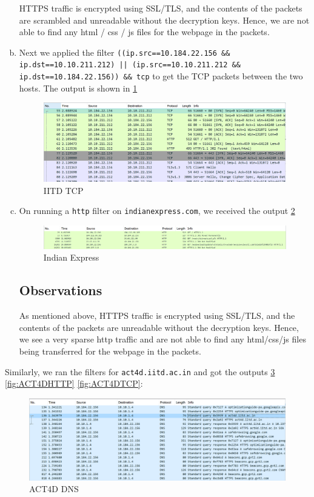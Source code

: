 \documentclass{article}
\begin{document}
\begin{enumerate}[a.]
    HTTPS traffic is encrypted using SSL/TLS, and the contents of the packets are scrambled and unreadable without the decryption keys. Hence, we are not able to find any html / css / js files for the webpage in the packets.

    
    \item Next we applied the filter {\tt ((ip.src==10.184.22.156 \&\& ip.dst==10.10.211.212) || (ip.src==10.10.211.212 \&\& ip.dst==10.184.22.156)) \&\& tcp} to get the TCP packets between the two hosts. The output is shown in \cref{fig:IITDTCP}
    \begin{figure}[!ht]
        \centering
        \includegraphics[scale=0.5]{images/IITD tcp.png}
        \caption{IITD TCP}
        \label{fig:IITDTCP}
    \end{figure}

    \item On running a {\tt http} filter on {\tt indianexpress.com}, we received the output \cref{fig:IndianExpress}
    \begin{figure}[!ht]
        \centering
        \includegraphics[scale=0.5]{images/indianexpress.png}
        \caption{Indian Express}
        \label{fig:IndianExpress}
    \end{figure}
    \subsection*{Observations}
    As mentioned above, HTTPS traffic is encrypted using SSL/TLS, and the contents of the packets are unreadable without the decryption keys. Hence, we see a very sparse http traffic and are not able to find any html/css/js files being transferred for the webpage in the packets.
\end{enumerate}

Similarly, we ran the filters for {\tt act4d.iitd.ac.in} and got the outputs \cref{fig:ACT4DDNS} \cref{fig:ACT4DHTTP} \cref{fig:ACT4DTCP}:
\begin{figure}[!ht]
    \centering
    \includegraphics[scale=0.5]{images/act4d dns.png}
    \caption{ACT4D DNS}
    \label{fig:ACT4DDNS}
\end{figure}
\end{document}

